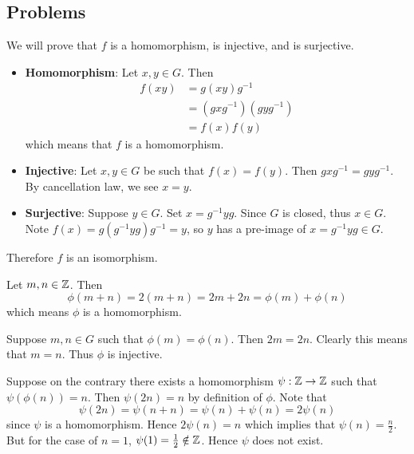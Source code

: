 \subsection*{Problems}
\begin{questions}
    \item We will prove that $f$ is a homomorphism, is injective, and is surjective.
    \begin{itemize}
        \item \textbf{Homomorphism}: Let $x, y \in G$. Then
        \begin{align*}
            f(xy) &= g(xy)g^{-1}\\
            &= (gxg^{-1})(gyg^{-1})\\
            &= f(x)f(y)
        \end{align*}
        which means that $f$ is a homomorphism.

        \item \textbf{Injective}: Let $x, y \in G$ be such that $f(x) = f(y)$. Then $gxg^{-1} = gyg^{-1}$. By cancellation law, we see $x = y$.

        \item \textbf{Surjective}: Suppose $y \in G$. Set $x = g^{-1}yg$. Since $G$ is closed, thus $x \in G$. Note $f(x) = g(g^{-1}yg)g^{-1} = y$, so $y$ has a pre-image of $x = g^{-1}yg \in G$.
    \end{itemize}
    Therefore $f$ is an isomorphism.

    \item \begin{partquestions}{\alph*}
        \item Let $m, n \in \mathbb{Z}$. Then
        \[
            \phi(m + n) = 2(m + n) = 2m + 2n = \phi(m) + \phi(n)
        \]
        which means $\phi$ is a homomorphism.

        \item Suppose $m, n \in G$ such that $\phi(m) = \phi(n)$. Then $2m = 2n$. Clearly this means that $m = n$. Thus $\phi$ is injective.

        \item Suppose on the contrary there exists a homomorphism $\psi: \mathbb{Z} \to \mathbb{Z}$ such that $\psi(\phi(n)) = n$. Then $\psi(2n) = n$ by definition of $\phi$. Note that
        \[
            \psi(2n) = \psi(n + n) = \psi(n) + \psi(n) = 2\psi(n)
        \]
        since $\psi$ is a homomorphism. Hence $2\psi(n) = n$ which implies that $\psi(n) = \frac n2$. But for the case of $n = 1$, $\psi(1) = \frac 12 \notin \mathbb{Z}$. Hence $\psi$ does not exist.
    \end{partquestions}


\end{questions}
